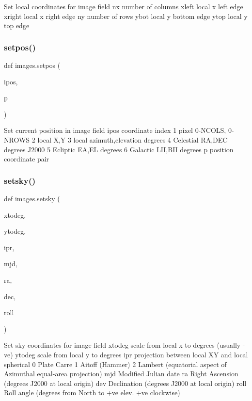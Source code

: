 \begin{DoxyVerb}Set local coordinates for image field
    nx     number of columns
    xleft  local x left edge
    xright local x right edge
    ny     number of rows
    ybot   local y bottom edge
    ytop   local y top edge
\end{DoxyVerb}
 \mbox{\label{namespaceimages_a3c53030859724daa5e9f1a7ff57ecf3a}} 
\subsubsection{\texorpdfstring{setpos()}{setpos()}}
{\footnotesize\ttfamily def images.\+setpos (\begin{DoxyParamCaption}\item[{}]{ipos,  }\item[{}]{p }\end{DoxyParamCaption})}

\begin{DoxyVerb}Set current position in image field
    ipos    coordinate index
        1 pixel 0-NCOLS, 0-NROWS
        2 local X,Y
        3 local azimuth,elevation degrees
        4 Celestial RA,DEC degrees J2000
        5 Ecliptic EA,EL degrees
        6 Galactic LII,BII degrees
    p       position coordinate pair
\end{DoxyVerb}
 \mbox{\label{namespaceimages_a7d6713340c9393df65d12c8950f974f4}} 
\subsubsection{\texorpdfstring{setsky()}{setsky()}}
{\footnotesize\ttfamily def images.\+setsky (\begin{DoxyParamCaption}\item[{}]{xtodeg,  }\item[{}]{ytodeg,  }\item[{}]{ipr,  }\item[{}]{mjd,  }\item[{}]{ra,  }\item[{}]{dec,  }\item[{}]{roll }\end{DoxyParamCaption})}

\begin{DoxyVerb}Set sky coordinates for image field
    xtodeg  scale from local x to degrees (usually -ve)
    ytodeg  scale from local y to degrees
    ipr     projection between local XY and local spherical
        0 Plate Carre
        1 Aitoff (Hammer)
        2 Lambert (equatorial aspect of Azimuthal equal-area projection)
    mjd     Modified Julian date
    ra      Right Ascension (degrees J2000 at local origin)
    dev     Declination (degrees J2000 at local origin)
    roll    Roll angle (degrees from North to +ve elev. +ve clockwise)
\end{DoxyVerb}
 \mbox{\label{namespaceimages_a7ce1b8de9c2c387025e825e92846dc13}} 
